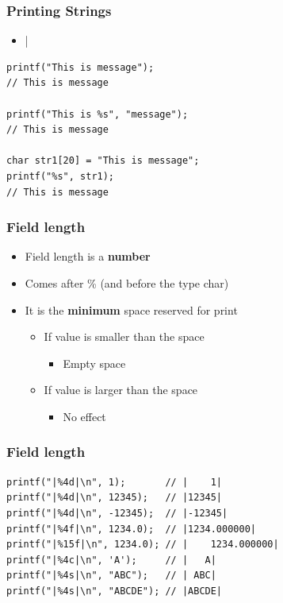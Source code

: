 \documentclass{../c-lecture}
\begin{document}
\begin{frame}[fragile]
  \frametitle{Printing Strings}
  \begin{itemize}
    \item {}|%
  \end{itemize}
  \begin{verbatim}
printf("This is message");
// This is message

printf("This is %s", "message");
// This is message

char str1[20] = "This is message";
printf("%s", str1);
// This is message
  \end{verbatim}
\end{frame}

\begin{frame}
  \frametitle{Field length}
  \begin{itemize}
    \item Field length is a \textbf{\color{Orange} number}
    \item Comes after \% (and before the type char)
    \item
      It is the \textbf{\color{Green} minimum} space reserved for print

    \begin{itemize}
      \item If value is smaller than the space
      \begin{itemize}
        \item Empty space
      \end{itemize}
      \item If value is larger than the space
      \begin{itemize}
        \item No effect
      \end{itemize}
    \end{itemize}
  \end{itemize}
\end{frame}

\begin{frame}[fragile]
  \frametitle{Field length}
  \begin{verbatim}
printf("|%4d|\n", 1);       // |    1|
printf("|%4d|\n", 12345);   // |12345|
printf("|%4d|\n", -12345);  // |-12345|
printf("|%4f|\n", 1234.0);  // |1234.000000|
printf("|%15f|\n", 1234.0); // |    1234.000000|
printf("|%4c|\n", 'A');     // |   A|
printf("|%4s|\n", "ABC");   // | ABC|
printf("|%4s|\n", "ABCDE"); // |ABCDE|
  \end{verbatim}
\end{frame}
\end{document}
